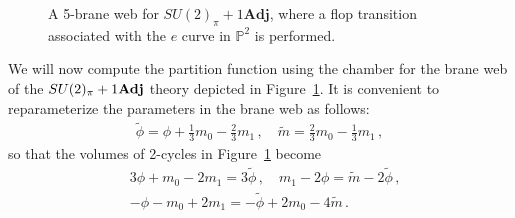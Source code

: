 \begin{figure}
	\centering
	\caption{A 5-brane web for $SU(2)_\pi+1\mathbf{Adj}$, where a flop transition associated with the $e$ curve in $\mathbb{P}^2$ is performed.} \label{fig:SU2_pi_adj_F_web}
\end{figure}
We will now compute the partition function using the chamber for the brane web of the $SU(2)_\pi+1{\bf Adj}$ theory depicted in Figure~\ref{fig:SU2_pi_adj_F_web}. It is convenient to reparameterize the parameters in the brane web as follows:
\begin{align}
\tilde{\phi} = \phi + \frac{1}{3}m_0 - \frac{2}{3} m_1 \, , \quad
\tilde{m} = \frac{2}{3} m_0 - \frac{1}{3} m_1 \, ,
\end{align}
so that the volumes of 2-cycles in Figure~\ref{fig:SU2_pi_adj_F_web} become
\begin{align}
&3\phi + m_0 - 2m_1 = 3\tilde{\phi} \, , \quad
m_1 - 2\phi = \tilde{m} - 2\tilde{\phi} \, , \nonumber \\
&-\phi - m_0 + 2m_1 = -\tilde{\phi} + 2m_0 - 4\tilde{m} \, .
\end{align}


